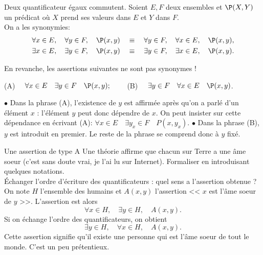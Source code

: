 \documentclass[11pt]{article}
\begin{document}
\begin{prop}{Deux quantificateur égaux commutent.}{}
    Soient $E,F$ deux ensembles et $\P(X,Y)$ un prédicat où $X$ prend ses valeurs dans $E$ et $Y$ dans $F$.\\
    On a les synonymies:
    \begin{equation*}
        \begin{aligned}
            \forall x \in E, \quad \forall y \in F, \quad \P(x,y) \quad &\equiv \quad \forall y \in F, \quad \forall x \in E, \quad \P(x,y),\\
            \exists x \in E, \quad \exists y \in F, \quad \P(x,y) \quad &\equiv \quad \exists y \in F, \quad \exists x \in E, \quad \P(x,y).
        \end{aligned}
    \end{equation*}
\end{prop}

\warning En revanche, les assertions suivantes ne sont pas synonymes !
\begin{center}
    (A) $\quad \forall x \in E\quad\exists y \in F\quad \P(x,y); \qquad$ (B) $\quad \exists y\in F \quad \forall x \in E\quad \P(x,y)$.
\end{center}
$\bullet$ Dans la phrase (A), l'existence de $y$ est affirmée après qu'on a parlé d'un élément $x$ : l'élément $y$ peut donc dépendre de $x$. On peut insister sur cette dépendance en écrivant (A): $\forall x\in E\quad\exists y_x\in F\quad P(x,y_x)$.\n
$\bullet$ Dans la phrase (B), $y$ est introduit en premier. Le reste de la phrase se comprend donc à $y$ fixé.

\pagebreak

\begin{ex}{Une assertion de type A}{}
    Une théorie affirme que chacun sur Terre a une âme soeur (c'est sans doute vrai, je l'ai lu sur Internet). Formaliser en introduisant quelques notations.\\
    Échanger l'ordre d'écriture des quantificateurs : quel sens a l'assertion obtenue ?
    \tcblower
    On note $H$ l'ensemble des humains et $A(x,y)$ l'assertion << $x$ est l'âme soeur de $y$ >>. L'assertion est alors
    \begin{equation*}
        \forall x \in H, \quad \exists y \in H, \quad A(x,y).
    \end{equation*}
    Si on échange l'ordre des quantificateurs, on obtient
    \begin{equation*}
        \exists y \in H, \quad \forall x \in H, \quad A(x,y).
    \end{equation*}
    Cette assertion signifie qu'il existe une personne qui est l'âme soeur de tout le monde. C'est un peu prétentieux.
\end{ex}
\end{document}
